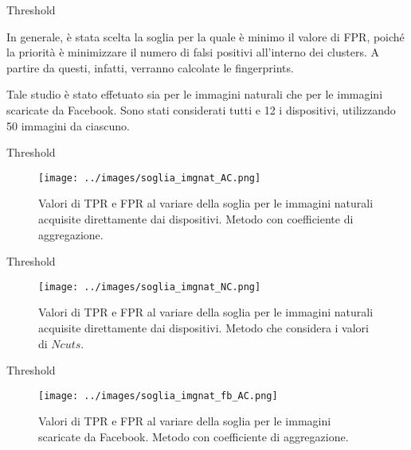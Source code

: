 \begin{tframe}{Threshold}

In generale, è stata scelta la soglia per la quale è minimo il valore di FPR, poiché la priorità è minimizzare il numero di falsi positivi all'interno dei clusters. A partire da questi, infatti, verranno calcolate le fingerprints.

\vspace{0.1in}

Tale studio è stato effetuato sia per le immagini naturali che per le immagini scaricate da Facebook. Sono stati considerati tutti e 12 i dispositivi, utilizzando 50 immagini da ciascuno.

\end{tframe}

\begin{tframe}{Threshold}

\begin{figure}[h]
\begin{center}
\texttt{[image: ../images/soglia\_imgnat\_AC.png]}
\end{center}
  \caption{Valori di TPR e FPR al variare della soglia per le immagini naturali acquisite direttamente dai dispositivi. Metodo con coefficiente di aggregazione.}
\label{fig:soglia AC}
\end{figure}

\end{tframe}

\begin{tframe}{Threshold}

\begin{figure}[h]
\begin{center}
\texttt{[image: ../images/soglia\_imgnat\_NC.png]}
\end{center}
  \caption{Valori di TPR e FPR al variare della soglia per le immagini naturali acquisite direttamente dai dispositivi. Metodo che considera i valori di $Ncuts$.}
\label{fig:soglia AC}
\end{figure}

\end{tframe}

\begin{tframe}{Threshold}

\begin{figure}[h]
\begin{center}
\texttt{[image: ../images/soglia\_imgnat\_fb\_AC.png]}
\end{center}
  \caption{Valori di TPR e FPR al variare della soglia per le immagini scaricate da Facebook. Metodo con coefficiente di aggregazione.}
\label{fig:soglia AC}
\end{figure}

\end{tframe}

